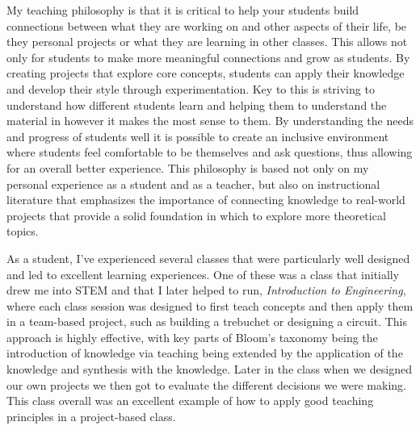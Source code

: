\documentclass[12pt]{article}
\begin{document}
 \pagestyle{plain}







My teaching philosophy is that it is critical to help your students build connections between what they are working on and other aspects of their life, be they personal projects or what they are learning in other classes.
This allows not only for students to make more meaningful connections and grow as students.
By creating projects that explore core concepts, students can apply their knowledge and develop their style through experimentation.
Key to this is striving to understand how different students learn and helping them to understand the material in however it makes the most sense to them.
By understanding the needs and progress of students well it is possible to create an inclusive environment where students feel comfortable to be themselves and ask questions, thus allowing for an overall better experience.
This philosophy is based not only on my personal experience as a student and as a teacher, but also on instructional literature that emphasizes the importance of connecting knowledge to real-world projects that provide a solid foundation in which to explore more theoretical topics.

As a student, I've experienced several classes that were particularly well designed and led to excellent learning experiences.
One of these was a class that initially drew me into STEM and that I later helped to run, \emph{Introduction to Engineering}, where each class session was designed to first teach concepts and then apply them in a team-based project, such as building a trebuchet or designing a circuit.
This approach is highly effective, with key parts of Bloom's taxonomy being the introduction of knowledge via teaching being extended by the application of the knowledge and synthesis with the knowledge.
Later in the class when we designed our own projects we then got to evaluate the different decisions we were making.
This class overall was an excellent example of how to apply good teaching principles in a project-based class.
\end{document}
